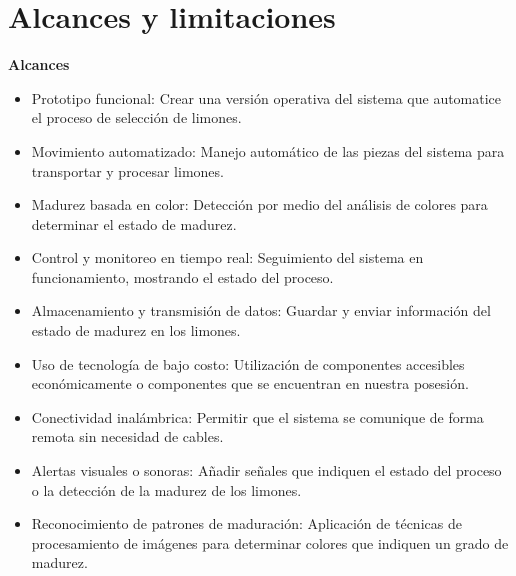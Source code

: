 \section{Alcances y limitaciones}

\textbf{Alcances}
\begin{itemize}
    \item Prototipo funcional: Crear una versión operativa del sistema que automatice el proceso de selección de limones. 
    \item Movimiento automatizado: Manejo automático de las piezas del sistema para transportar y procesar limones. 
    \item Madurez basada en color: Detección por medio del análisis de colores para determinar el estado de madurez. 
    \item Control y monitoreo en tiempo real: Seguimiento del sistema en funcionamiento, mostrando el estado del proceso.
    \item Almacenamiento y transmisión de datos: Guardar y enviar información del estado de madurez en los limones.
    \item Uso de tecnología de bajo costo: Utilización de componentes accesibles económicamente o componentes que se encuentran en nuestra posesión. 
    \item Conectividad inalámbrica: Permitir que el sistema se comunique de forma remota sin necesidad de cables.
    \item Alertas visuales o sonoras: Añadir señales que indiquen el estado del proceso o la detección de la madurez de los limones.
    \item Reconocimiento de patrones de maduración: Aplicación de técnicas de procesamiento de imágenes para determinar colores que indiquen un grado de madurez.
\end{itemize}

